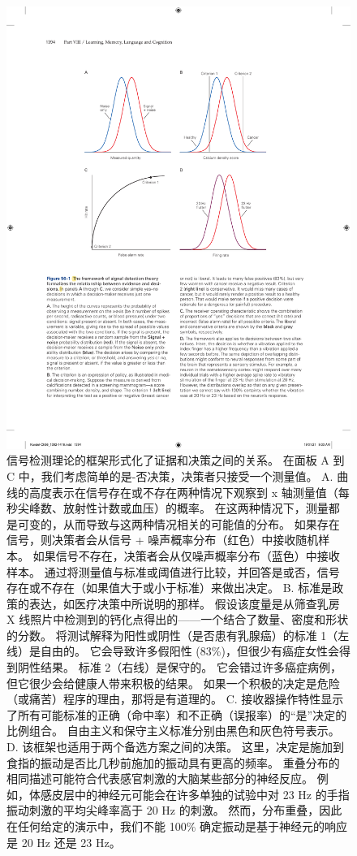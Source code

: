 \begin{figure}[htbp]
	\centering
	\includegraphics[width=0.7\linewidth]{chap56/fig_56_1}
	\caption{信号检测理论的框架形式化了证据和决策之间的关系。 在面板 A 到 C 中，我们考虑简单的是-否决策，决策者只接受一个测量值。 A. 曲线的高度表示在信号存在或不存在两种情况下观察到 x 轴测量值（每秒尖峰数、放射性计数或血压）的概率。 在这两种情况下，测量都是可变的，从而导致与这两种情况相关的可能值的分布。 如果存在信号，则决策者会从信号 + 噪声概率分布（红色）中接收随机样本。 如果信号不存在，决策者会从仅噪声概率分布（蓝色）中接收样本。 通过将测量值与标准或阈值进行比较，并回答是或否，信号存在或不存在（如果值大于或小于标准）来做出决定。 B. 标准是政策的表达，如医疗决策中所说明的那样。 假设该度量是从筛查乳房 X 线照片中检测到的钙化点得出的——一个结合了数量、密度和形状的分数。 将测试解释为阳性或阴性（是否患有乳腺癌）的标准 1（左线）是自由的。 它会导致许多假阳性 (83\%)，但很少有癌症女性会得到阴性结果。 标准 2（右线）是保守的。 它会错过许多癌症病例，但它很少会给健康人带来积极的结果。 如果一个积极的决定是危险（或痛苦）程序的理由，那将是有道理的。 C. 接收器操作特性显示了所有可能标准的正确（命中率）和不正确（误报率）的“是”决定的比例组合。 自由主义和保守主义标准分别由黑色和灰色符号表示。 D. 该框架也适用于两个备选方案之间的决策。 这里，决定是施加到食指的振动是否比几秒前施加的振动具有更高的频率。 重叠分布的相同描述可能符合代表感官刺激的大脑某些部分的神经反应。 例如，体感皮层中的神经元可能会在许多单独的试验中对 23 Hz 的手指振动刺激的平均尖峰率高于 20 Hz 的刺激。 然而，分布重叠，因此在任何给定的演示中，我们不能 100\% 确定振动是基于神经元的响应是 20 Hz 还是 23 Hz。}
	\label{fig:56_1}
\end{figure}


